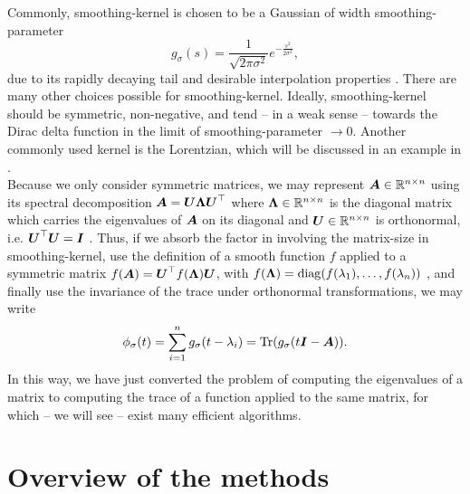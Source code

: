 Commonly, \gls{smoothing-kernel} is chosen to be a Gaussian of width \gls{smoothing-parameter}
\begin{equation}
    g_{\sigma}(s) = \frac{1}{\sqrt{2 \pi \sigma^2}} e^{-\frac{s^2}{2\sigma^2}},
    \label{equ:1-introduction-def-gaussian-kernel}
\end{equation}
due to its rapidly decaying tail and desirable interpolation properties \cite{lin2017randomized}.
There are many other choices possible for \gls{smoothing-kernel}. Ideally,
\gls{smoothing-kernel} should be symmetric, non-negative, and tend -- in a weak sense --
towards the Dirac delta function in the limit of \gls{smoothing-parameter} $\to 0$. Another
commonly used kernel is the Lorentzian, which will be discussed in an example
in .\\

Because we only consider symmetric matrices, 
we may represent $\boldsymbol{A} \in \mathbb{R}^{n \times n}$ using its spectral
decomposition $\boldsymbol{A} = \boldsymbol{U} \boldsymbol{\Lambda} \boldsymbol{U}^{\top}$ where
$\boldsymbol{\Lambda} \in \mathbb{R}^{n \times n}$ is the diagonal matrix which carries
the eigenvalues of $\boldsymbol{A}$ on its diagonal and $\boldsymbol{U} \in \mathbb{R}^{n \times n}$
is orthonormal, i.e. $\boldsymbol{U}^{\top} \boldsymbol{U} = \boldsymbol{I}$ \cite[theorem~4.1.5]{horn1985matrix}.
Thus, if we absorb the factor in 
involving the \gls{matrix-size} in \gls{smoothing-kernel},
use the definition of a smooth function $f$ applied to a symmetric matrix
$f(\boldsymbol{A}) = \boldsymbol{U}^{\top} f(\boldsymbol{\Lambda}) \boldsymbol{U}$,
with $f(\boldsymbol{\Lambda}) = \operatorname{diag}(f(\lambda_1), \dots, f(\lambda_n))$ \cite[definition~1.2]{higham2008functions},
and finally use the invariance of the trace under orthonormal transformations, we may write
\begin{equation}
    \phi_{\sigma}(t) = \sum_{i=1}^n g_{\sigma}(t - \lambda_i) = \operatorname{Tr}(g_{\sigma}(t\boldsymbol{I} - \boldsymbol{A})).
    \label{equ:1-introduction-spectral-density-as-trace}
\end{equation}
In this way, we have just converted the problem of computing the eigenvalues of
a matrix to computing the trace of a function applied to the same matrix,
for which -- we will see -- exist many efficient algorithms.


\section{Overview of the methods}
\label{sec:1-introduction-overview}

